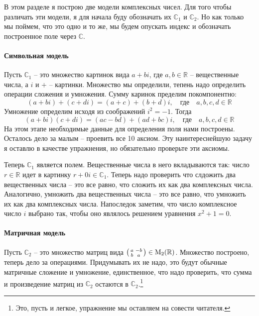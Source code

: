 В этом разделе я построю две модели комплексных чисел. Для того чтобы различать эти модели, я для начала буду обозначать их $\mathbb C_1$ и $\mathbb C_2$. Но как только мы поймем, что это одно и то же, мы будем опускать индекс и обозначать построенное поле через $\mathbb C$.

\paragraph{Символьная модель}

Пусть $\mathbb C_1$ -- это множество картинок вида $a+bi$, где $a,b\in\mathbb R$ -- вещественные числа, а $i$ и $+$ -- картинки. Множество мы определили, тепень надо определить операции сложения и умножения. Сумму каринок пределим покомпонентно:
\[
(a+bi) + (c+di) = (a+c) + (b+d) i, \quad\text{где}\quad a,b,c,d\in\mathbb R
\]
Умножение определим исходя из соображений $i^2 = -1$. Тогда
\[
(a+bi)(c+di) = (ac - bd) + (ad + bc)i,\quad\text{где}\quad a,b,c,d\in\mathbb R
\]
На этом этапе необходимые данные для определения поля нами построены. Осталось дело за малым -- проевить все 10 аксиом. Эту наинтереснейшую задачу я оставлю в качестве упражнения, но обязательно проверьте эти аксиомы.

Теперь $\mathbb C_1$ является полем. Вещественные числа в него вкладываются так: число $r\in\mathbb R$ идет в картинку $r + 0 i\in\mathbb C_1$. Теперь надо проверить что слдожить два вещественных числа -- это все равно, что сложить их как два комплексных числа. Аналогично, умножить два вещественных числа -- это все равно, что умножить их как два комплексных числа. Напоследок заметим, что число комплексное число $i$ выбрано так, чтобы оно являлось решением уравнения $x^2 + 1 = 0$.

\paragraph{Матричная модель}

Пусть $\mathbb C_2$ -- это множество матриц вида $\left(\begin{smallmatrix}{a}&{-b}\\{b}&{a}\end{smallmatrix}\right)\in\operatorname{M}_{2}(\mathbb R)$. Множество построено, теперь дело за операциями. Придумывать их не надо, это будут обычные матричные сложение и умножение, единственное, что надо проверить, что сумма и произведение матриц из $\mathbb C_2$ остаются в $\mathbb C_2$.\footnote{Это, пусть и легкое, упражнение мы оставляем на совести читателя.} 

